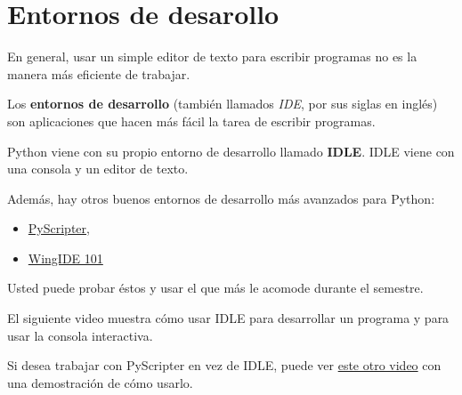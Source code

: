 \section{Entornos de desarollo}

En general, usar un simple editor de texto para escribir programas no es
la manera más eficiente de trabajar.

Los \textbf{entornos de desarrollo} (también llamados \emph{IDE}, por
sus siglas en inglés) son aplicaciones que hacen más fácil la tarea de
escribir programas.

Python viene con su propio entorno de desarrollo llamado \textbf{IDLE}.
IDLE viene con una consola y un editor de texto.

Además, hay otros buenos entornos de desarrollo más avanzados para
Python:

\begin{itemize}
\item
  \href{http://code.google.com/p/pyscripter/downloads/list}{PyScripter},
\item
  \href{http://www.wingware.com/downloads/wingide-101/3.2.12-1/binaries}{WingIDE
  101}
\end{itemize}

Usted puede probar éstos y usar el que más le acomode durante el
semestre.

El siguiente video muestra cómo usar IDLE para desarrollar un programa y
para usar la consola interactiva.

Si desea trabajar con PyScripter en vez de IDLE, puede ver
\href{http://www.youtube.com/watch?v=bzF5rDtQLS4}{este otro video} con
una demostración de cómo usarlo.

